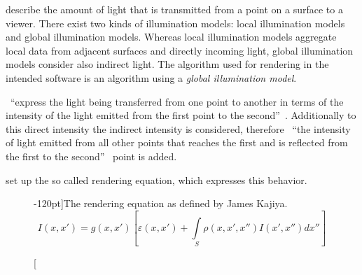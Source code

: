\documentclass[%
    a4paper,
    nobib,   %
    openany  %
]{tufte-book}
\begin{document}
 describe the amount of light that is
transmitted from a point on a surface to a viewer. There exist two kinds of
illumination models: local illumination models and global illumination models.
Whereas local illumination models aggregate local data from adjacent surfaces
and directly incoming light, global illumination models consider also indirect
light. The algorithm used for rendering in the intended software is an
algorithm using a \textit{global illumination model}.

~\enquote{express the light being
transferred from one point to another in terms of the intensity of the light
emitted from the first point to the second}~\cite[pp. 775 and
776]{foley_computer_1996}. Additionally to this direct intensity the indirect
intensity is considered, therefore ~\enquote{the intensity of light emitted from
all other points that reaches the first and is reflected from the first to the
second}~\cite[pp. 775 and 776]{foley_computer_1996} point is added.

 set up the so called rendering
equation, which expresses this behavior.~\parencites{kajiya_rendering_1986}[p.
776]{foley_computer_1996}

\begin{figure}
  \label{eq:rendering-equation}
  \caption[][-120pt]{The rendering equation as defined by James Kajiya.}
  \begin{equation}
    I(x, x') = g(x, x')[\varepsilon(x, x') + \int\limits_{S}\rho(x, x', x'')I(x', x'')dx'']
  \end{equation}
\end{figure}

\end{document}
